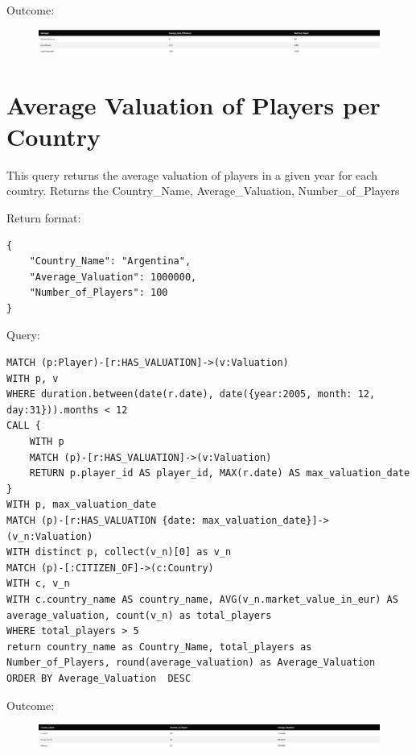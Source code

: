 \documentclass{Configuration_Files/PoliMi3i_thesis}
\begin{document}
Outcome:
\begin{figure}[H]
    \centering
    \includegraphics[width=\linewidth]{Project Template/Images/query_output/q16.png}
\end{figure}









\section{Average Valuation of Players per Country}
This query returns the average valuation of players in a given year for each country.
Returns the Country\_Name, Average\_Valuation, Number\_of\_Players


Return format:
\begin{lstlisting}[style=json]
{
    "Country_Name": "Argentina",
    "Average_Valuation": 1000000,
    "Number_of_Players": 100
}
\end{lstlisting}


Query:

\begin{lstlisting}[language=Cypher]
MATCH (p:Player)-[r:HAS_VALUATION]->(v:Valuation)
WITH p, v
WHERE duration.between(date(r.date), date({year:2005, month: 12, day:31})).months < 12
CALL {
    WITH p
    MATCH (p)-[r:HAS_VALUATION]->(v:Valuation)
    RETURN p.player_id AS player_id, MAX(r.date) AS max_valuation_date
}
WITH p, max_valuation_date
MATCH (p)-[r:HAS_VALUATION {date: max_valuation_date}]->(v_n:Valuation)
WITH distinct p, collect(v_n)[0] as v_n
MATCH (p)-[:CITIZEN_OF]->(c:Country)
WITH c, v_n
WITH c.country_name AS country_name, AVG(v_n.market_value_in_eur) AS average_valuation, count(v_n) as total_players
WHERE total_players > 5
return country_name as Country_Name, total_players as Number_of_Players, round(average_valuation) as Average_Valuation
ORDER BY Average_Valuation  DESC
\end{lstlisting}


Outcome:
\begin{figure}[H]
    \centering
    \includegraphics[width=\linewidth]{Project Template/Images/query_output/q17.png}
\end{figure}
\end{document}
